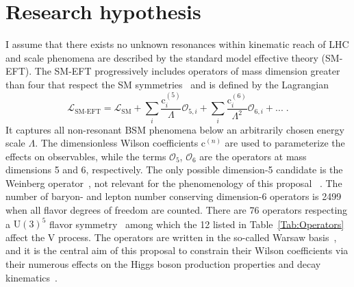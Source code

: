 \documentclass[a4paper,11pt]{article}
\newcommand{\Pb}{{{\Pqb}}\xspace}
\newcommand{\PAb}{{{{\Paqb}}}\xspace}
\renewcommand{\PV}{{{{V}}}\xspace}
\newcommand{\VH}{{{\PV}{\PH}}\xspace}
\begin{document}
\section{Research hypothesis}
\label{sec:research_hypo}


I assume that there exists no unknown resonances within kinematic reach of LHC and 
\TeV scale phenomena are described by the standard model effective theory (SM-EFT). 
The SM-EFT progressively includes operators of mass dimension greater than four that respect the SM symmetries~\cite{Jenkins:2013zja,Alonso:2013hga,Jenkins:2013wua,Englert:2014cva,Brivio:2017vri} and is defined by the Lagrangian
\begin{equation}
\mathcal{L}_{\text{SM-EFT}} = \mathcal{L}_{\text{SM}} +  {\sum}_{i} \frac{\text{c}_i^{\left(5\right)}}{\Lambda} \mathcal{O}_{5,i} + {\sum}_{i} \frac{\text{c}_i^{\left(6\right)}}{{\Lambda}^{2}} \mathcal{O}_{6,i} + ... \;.
\label{Eq:SMEFT}
\end{equation}
It captures all non-resonant BSM phenomena below an arbitrarily chosen energy scale $\Lambda$.
The dimensionless Wilson coefficients $\text{c}^{\left(n\right)}$ are used to parameterize the effects on observables, while the terms $\mathcal{O}_5$, $\mathcal{O}_6$ are  the operators at mass dimensions 5 and 6, respectively.
The only possible dimension-5 candidate is the  Weinberg operator~\cite{PhysRevLett.43.1566}, not relevant for the phenomenology of this proposal ~\cite{Bonnet:2009ej}.
The number of baryon- and lepton number conserving dimension-6 operators is 2499 when all flavor degrees of freedom are counted. There are 76 operators respecting a $\textrm{U}(3)^5$ flavor symmetry~\cite{Alonso:2013hga} among which the 12 listed in Table~\ref{Tab:Operators} affect the \VH process.
The operators are written in the so-called Warsaw basis~\cite{Grzadkowski:2010es}, and it is the central aim of this proposal to constrain their Wilson coefficients via their numerous effects on the Higgs boson production properties and decay kinematics~\cite{Hagiwara:1993qt,Ellis:2014dva,Murphy:2017omb,Baglio:2020oqu}.
\end{document}
